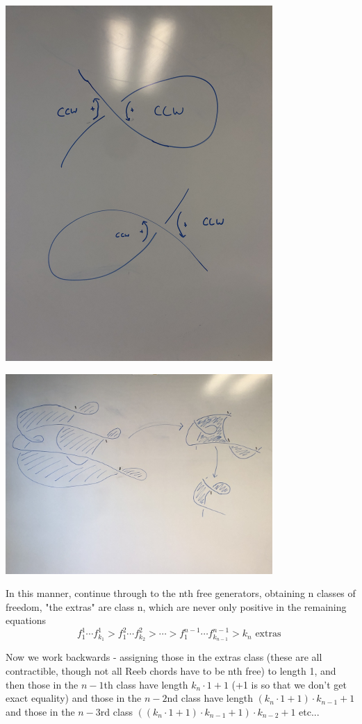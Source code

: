 \documentclass[11pt]{amsart}
\begin{document}
\includegraphics[width=4in,angle=-90]{Exterior Loops.JPG}



\includegraphics[width=4in]{Visualization of Algorithm.JPG}

In this manner, continue through to the nth free generators, obtaining n classes of freedom, "the extras" are class n, which are never only positive in the remaining equations
\[f^{1}_1 \cdots f^{1}_{k_1} > f^{2}_1 \cdots f^{2}_{k_2}> \cdots > f^{n-1}_1 \cdots f^{n-1}_{k_{n-1}} > k_n \text{ extras }\]

Now we work backwards - assigning those in the extras class (these are all contractible, though not all Reeb chords have to be nth free) to length 1, and then those in the $n-1$th class have length $k_n \cdot 1 + 1$ (+1 is so that we don't get exact equality) and those in the $n-2$nd class have length $ (k_n \cdot 1 + 1)\cdot k_{n-1} + 1$ and those in the $n-3$rd class $ ((k_n \cdot 1 + 1)\cdot k_{n-1} + 1)\cdot k_{n-2} + 1$ etc...
\end{document}
